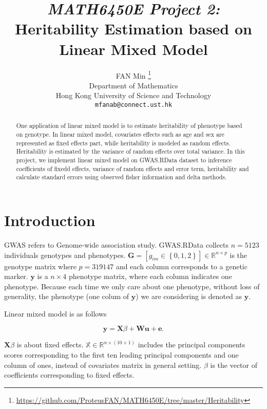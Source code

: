 \documentclass{article}
\title{\emph{MATH6450E Project 2:} Heritability Estimation based on Linear Mixed Model}
\author{%
  FAN Min
  \thanks{\url{https://github.com/ProteusFAN/MATH6450E/tree/master/Heritability}} \\
  Department of Mathematics\\
  Hong Kong University of Science and Technology\\
  \texttt{mfanab@connect.ust.hk} \\
}
\begin{document}

\maketitle

\begin{abstract}
	
	One application of linear mixed model is to estimate heritability of phenotype based on genotype. In linear mixed model, covariates effects such as age and sex are represented as fixed effects part, while heritability is modeled as random effects. Heritability is estimated by the variance of random effects over total variance. In this project, we implement linear mixed model on GWAS.RData dataset to inference coefficients of fixedd effects, variance of random effects and error term, heritability and calculate standard errors using observed fisher information and delta methods.
	
\end{abstract}

\section{Introduction}

GWAS refers to Genome-wide association study. GWAS.RData collects $ n = 5123 $ individuals genotypes and phenotypes. $ \mathbf{G} = [g_{im} \in \left\lbrace  0, 1, 2  \right\rbrace] \in \mathbb{R}^{n \times p} $ is the genotype matrix where $ p = 319147 $ and each column corresponds to a genetic marker. $ \mathbf{y} $ is a $ n \times 4 $ phenotype matrix, where each column indicates one phenotype. Because each time we only care about one phenotype, without loss of generality, the phenotype (one colum of $ \mathbf{y} $) we are considering is denoted as $ \mathbf{y} $.

Linear mixed model is as follows

\begin{equation}
	\mathbf{y} = \mathbf{X} \beta  + \mathbf{W u} + \mathbf{e}.
\end{equation}

$ \mathbf{X} \beta $ is about fixed effects. $ \mathbb{X} \in \mathbb{R}^{n \times (10 +1) } $ includes the principal components scores corresponding to the first ten leading principal components and one column of ones, instead of covariates matrix in general setting. $ \beta $ is the vector of coefficients corresponding to fixed effects.
\end{document}
